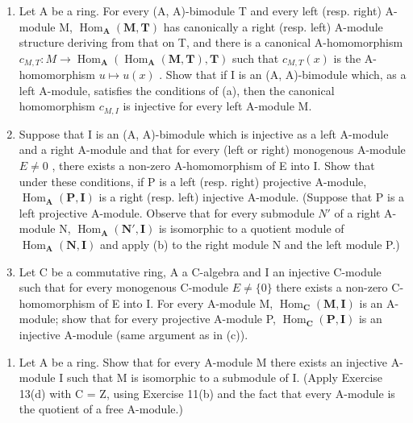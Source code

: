 \begin{enumerate}
\def\labelenumi{(\alph{enumi})}
\setcounter{enumi}{1}
\item
  Let A be a ring. For every (A, A)-bimodule T and every left (resp. right) A-module M, \(\operatorname{Hom}_{\mathbf{A}}(\mathbf{M}, \mathbf{T})\) has canonically a right (resp. left) A-module structure deriving from that on T, and there is a canonical A-homomorphism \(c_{M,T}: M \to \operatorname{Hom}_{\mathbf{A}}(\operatorname{Hom}_{\mathbf{A}}(\mathbf{M}, \mathbf{T}), \mathbf{T})\) such that \(c_{M,T}(x)\) is the A-homomorphism \(u \mapsto u(x)\) . Show that if I is an (A, A)-bimodule which, as a left A-module, satisfies the conditions of (a), then the canonical homomorphism \(c_{M,I}\) is injective for every left A-module M.
\item
  Suppose that I is an (A, A)-bimodule which is injective as a left A-module and a right A-module and that for every (left or right) monogenous A-module \(E \neq 0\) , there exists a non-zero A-homomorphism of E into I. Show that under these conditions, if P is a left (resp. right) projective A-module, \(\operatorname{Hom}_{\mathbf{A}}(\mathbf{P}, \mathbf{I})\) is a right (resp. left) injective A-module. (Suppose that P is a left projective A-module. Observe that for every submodule \(N'\) of a right A-module N, \(\operatorname{Hom}_{\mathbf{A}}(\mathbf{N}', \mathbf{I})\) is isomorphic to a quotient module of \(\operatorname{Hom}_{\mathbf{A}}(\mathbf{N}, \mathbf{I})\) and apply (b) to the right module N and the left module P.)
\item
  Let C be a commutative ring, A a C-algebra and I an injective C-module such that for every monogenous C-module \(E \neq \{0\}\) there exists a non-zero C-homomorphism of E into I. For every A-module M, \(\operatorname{Hom}_{\mathbf{C}}(\mathbf{M}, \mathbf{I})\) is an A-module; show that for every projective A-module P, \(\operatorname{Hom}_{\mathbf{C}}(\mathbf{P}, \mathbf{I})\) is an injective A-module (same argument as in (c)).
\end{enumerate}

\begin{enumerate}
\def\labelenumi{\arabic{enumi}.}
\setcounter{enumi}{13}
\tightlist
\item
  Let A be a ring. Show that for every A-module M there exists an injective A-module I such that M is isomorphic to a submodule of I. (Apply Exercise 13(d) with C = Z, using Exercise 11(b) and the fact that every A-module is the quotient of a free A-module.)
\end{enumerate}


